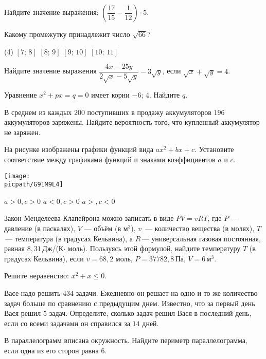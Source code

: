 \begin{class}[number=4]
	\begin{listofex}
		\item Найдите значение выражения: \(\left( \dfrac{ 17 }{ 15 }-\dfrac{ 1 }{ 12 }\right)\cdot5 \).
		\item Какому промежутку принадлежит число \(\sqrt{66}\)?
		\begin{tasks}(4)
			\task \( [7;\,8] \)
			\task \( [8;\,9] \)
			\task \( [9;\,10] \)
			\task \( [10;\,11] \)
		\end{tasks}
		\item Найдите значение выражения \( \dfrac{ 4x-25y }{ 2\sqrt{x}-5\sqrt{y} }-3\sqrt{y} \), если \( \sqrt{x}+\sqrt{y}=4 \).
		\item Уравнение \(x^2+px=q=0\) имеет корни \(-6\); \(4\). Найдите \(q\).
		\item В среднем из каждых \(200\) поступивших в продажу аккумуляторов \(196\) аккумуляторов заряжены. Найдите вероятность того, что купленный аккумулятор не заряжен.
		\item На рисунке изображены графики функций вида \(ax^2+bx+c\). Установите соответствие между графиками функций и знаками коэффициентов \(a\) и \(c\).
		\begin{center}
			\texttt{[image: \\picpath/G91M9L4]}
		\end{center}
	\begin{tasks}
		\task \( a>0, c>0 \)
		\task \( a<0, c>0 \)
		\task \( a>, c<0 \)
	\end{tasks}
		\item Закон Менделеева-Клапейрона можно записать в виде \(PV=vRT\), где \(P\) --- давление (в паскалях), \(V\) --- объём (в м\(^3\)), \(v\)  --- количество вещества (в молях), \(T\) --- температура (в градусах Кельвина), а \(R\) --- универсальная газовая постоянная, равная \(8,31\) Дж/(К\(\cdot\) моль). Пользуясь этой формулой, найдите температуру \(T\) (в градусах Кельвина), если \(v=68,2\) моль, \(P=37 782,8\) Па, \(V=6\) м\(^3\).
		\item Решите неравенство: \(x^2+x\le0\).
		\item Васе надо решить \(434\) задачи. Ежедневно он решает на одно и то же количество задач больше по сравнению с предыдущим днем. Известно, что за первый день Вася решил \(5\) задач. Определите, сколько задач решил Вася в последний день, если со всеми задачами он справился за \(14\) дней.
		\item В параллелограмм вписана окружность. Найдите периметр параллелограмма, если одна из его сторон равна \(6\).

\end{listofex}
\end{class}
